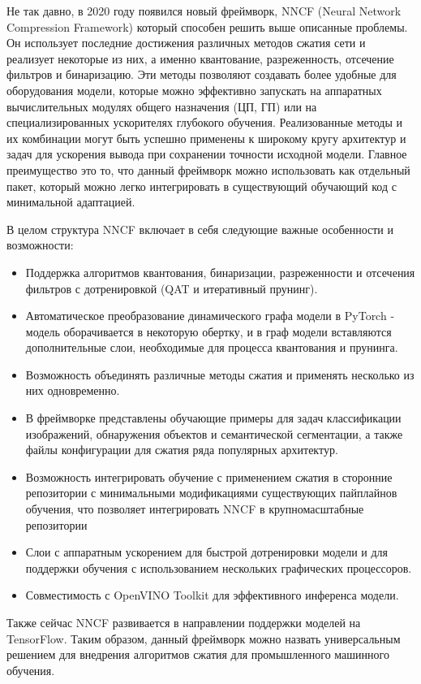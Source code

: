 \documentclass[oneside,final,12pt]{extreport}
\begin{document}
Не так давно, в 2020 году появился новый фреймворк, NNCF (Neural Network Compression Framework) который способен решить выше описанные проблемы. Он использует последние достижения различных методов сжатия сети и реализует некоторые из них, а именно квантование, разреженность, отсечение фильтров и бинаризацию. Эти методы позволяют создавать более удобные для оборудования модели, которые можно эффективно запускать на аппаратных вычислительных модулях общего назначения (ЦП, ГП) или на специализированных ускорителях глубокого обучения. Реализованные методы и их комбинации могут быть успешно применены к широкому кругу архитектур и задач для ускорения вывода при сохранении точности исходной модели. Главное преимущество это то, что данный фреймворк можно использовать как отдельный пакет, который можно легко интегрировать в существующий обучающий код с минимальной адаптацией.

В целом структура NNCF включает в себя следующие важные особенности и возможности:
\begin{itemize}
    \item Поддержка алгоритмов квантования, бинаризации, разреженности и отсечения фильтров с дотренировкой (QAT и итеративный прунинг).
    \item Автоматическое преобразование динамического графа модели в PyTorch - модель оборачивается в некоторую обертку, и в граф модели вставляются дополнительные слои, необходимые для процесса квантования и прунинга.
    \item Возможность объединять различные методы сжатия и применять несколько из них одновременно.
    \item В фреймворке представлены обучающие примеры для задач классификации изображений, обнаружения объектов и семантической сегментации, а также файлы конфигурации для сжатия ряда популярных архитектур.
    \item Возможность интегрировать обучение с применением сжатия в сторонние репозитории с минимальными модификациями существующих пайплайнов обучения, что позволяет интегрировать NNCF в крупномасштабные репозитории
    \item Слои с аппаратным ускорением для быстрой дотренировки модели и для поддержки обучения с использованием нескольких графических процессоров.
    \item Совместимость с OpenVINO Toolkit для эффективного инференса модели.
\end{itemize}

Также сейчас NNCF развивается в направлении поддержки моделей на TensorFlow. Таким образом, данный фреймворк можно назвать универсальным решением для внедрения алгоритмов сжатия для промышленного машинного обучения.
\end{document}
